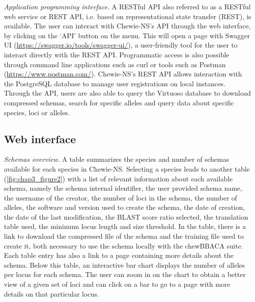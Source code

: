 \textit{Application programming interface}. A \ac{REST}ful \ac{API} also referred to as a \ac{REST}ful web service or \ac{REST} \ac{API}, i.e. based on representational state transfer (REST), is available. The user can interact with \ac{Chewie-NS}’s \ac{API} through the web interface, by clicking on the ‘API’ button on the menu. This will open a page with Swagger \ac{UI} (\url{https://swagger.io/tools/swagger-ui/}), a user-friendly tool for the user to interact directly with the \ac{REST} \ac{API}. Programmatic access is also possible through command line applications such as curl or tools such as Postman (\url{https://www.postman.com/}). \ac{Chewie-NS}’s \ac{REST} \ac{API} allows interaction with the PostgreSQL database to manage user registrations on local instances. Through the \ac{API}, users are also able to query the Virtuoso database to download compressed schemas, search for specific alleles and query data about specific species, loci or alleles.

\subsection{Web interface} \label{ssec:ch3_database_creation_interface}

\textit{Schemas overview}. A table summarizes the species and number of schemas available for each species in \ac{Chewie-NS}. Selecting a species leads to another table (\ref{fig:chap3_figure2}) with a list of relevant information about each available schema, namely the schema internal identifier, the user provided schema name, the username of the creator, the number of loci in the schema, the number of alleles, the software and version used to create the schema, the date of creation, the date of the last modification, the BLAST \cite{altschul_basic_1990} score ratio selected, the translation table used, the minimum locus length and size threshold. In the table, there is a link to download the compressed file of the schema and the training file used to create it, both necessary to use the schema locally with the chewBBACA suite. Each table entry has also a link to a page containing more details about the schema. Below this table, an interactive bar chart displays the number of alleles per locus for each schema. The user can zoom in on the chart to obtain a better view of a given set of loci and can click on a bar to go to a page with more details on that particular locus.

